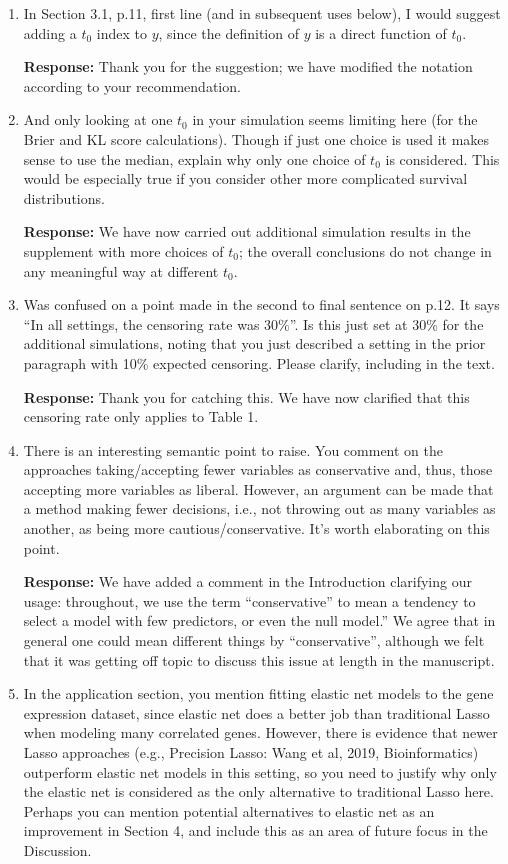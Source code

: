 \documentclass[12]{article}
\newcommand{\re}{\textbf{Response: }}
\begin{document}
\begin{enumerate}[align = left]
  \re Thank you for the suggestion; we have added the sentence as you suggest.

\item In Section 3.1, p.11, first line (and in subsequent uses below), I would suggest adding a $t_0$ index to $y$, since the definition of $y$ is a direct function of $t_0$.

  \re Thank you for the suggestion; we have modified the notation according to your recommendation.

\item And only looking at one $t_0$ in your simulation seems limiting here (for the Brier and KL score calculations). Though if just one choice is used it makes sense to use the median, explain why only one choice of $t_0$ is considered.  This would be especially true if you consider other more complicated survival distributions.

  \re We have now carried out additional simulation results in the supplement with more choices of $t_0$; the overall conclusions do not change in any meaningful way at different $t_0$.

\item Was confused on a point made in the second to final sentence on p.12. It says “In all settings, the censoring rate was 30$\%$”. Is this just set at 30$\%$ for the additional simulations, noting that you just described a setting in the prior paragraph with 10$\%$ expected censoring. Please clarify, including in the text.

\re Thank you for catching this. We have now clarified that this censoring rate only applies to Table 1.

\item There is an interesting semantic point to raise. You comment on the approaches taking/accepting fewer variables as conservative and, thus, those accepting more variables as liberal. However, an argument can be made that a method making fewer decisions, i.e., not throwing out as many variables as another, as being more cautious/conservative. It’s worth elaborating on this point.

  \re We have added a comment in the Introduction clarifying our usage: throughout, we use the term ``conservative'' to mean a tendency to select a model with few predictors, or even the null model.'' We agree that in general one could mean different things by ``conservative'', although we felt that it was getting off topic to discuss this issue at length in the manuscript.

\item In the application section, you mention fitting elastic net models to the gene expression dataset, since elastic net does a better job than traditional Lasso when modeling many correlated genes. However, there is evidence that newer Lasso approaches (e.g., Precision Lasso: Wang et al, 2019, Bioinformatics) outperform elastic net models in this setting, so you need to justify why only the elastic net is considered as the only alternative to traditional Lasso here. Perhaps you can mention potential alternatives to elastic net as an improvement in Section 4, and include this as an area of future focus in the Discussion.


\end{enumerate}
\end{document}
